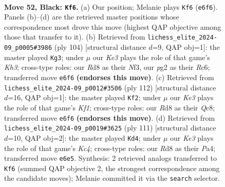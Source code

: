 \documentclass[11pt]{article}
\begin{document}
\clearpage

\begin{figure}[p]\centering
\begin{subfigure}{0.46\textwidth}\centering
\resizebox{\linewidth}{!}{%
\newchessgame
\chessboard[
  setfen={3r4/1Q6/4k3/8/4P3/8/6PP/1K6 b - - 0 52},
  showmover=false,
  pgfstyle=straightmove, color=movearrow, markmove={e6-f6}
]}
\caption{}
\end{subfigure}\hfill
\begin{subfigure}{0.46\textwidth}\centering
\resizebox{\linewidth}{!}{%
\newchessgame
\chessboard[
  setfen={8/p3k3/2R5/7p/8/5N1K/q7/8 w - - 2 53},
  showmover=false,
  pgfstyle=straightmove, color=movearrow, markmove={h3-g3}
]}
\caption{}
\end{subfigure}
\\[4pt]
\begin{subfigure}{0.46\textwidth}\centering
\resizebox{\linewidth}{!}{%
\newchessgame
\chessboard[
  setfen={2Q5/5k2/8/3q4/4p3/8/8/5K2 w - - 0 57},
  showmover=false,
  pgfstyle=straightmove, color=movearrow, markmove={f1-f2}
]}
\caption{}
\end{subfigure}\hfill
\begin{subfigure}{0.46\textwidth}\centering
\resizebox{\linewidth}{!}{%
\newchessgame
\chessboard[
  setfen={8/2K2Q2/8/2k5/p5P1/P7/8/8 b - - 0 56},
  showmover=false,
  pgfstyle=straightmove, color=movearrow, markmove={c5-d4}
]}
\caption{}
\end{subfigure}
\caption{\textbf{Move 52, Black: \texttt{Kf6}.} (a) Our position; Melanie plays \texttt{Kf6} (\texttt{e6f6}). Panels (b)--(d) are the retrieved master positions whose correspondence most drove this move (highest QAP objective among those that transfer to it). (b) Retrieved from \texttt{lichess\_elite\_2024-09\_p0005\#3986} (ply 104) [structural distance $d$=9, QAP obj=1]: the master played \texttt{Kg3}; under $\mu$ our \emph{Ke3} plays the role of that game's \emph{Kh3}; cross-type roles: our \emph{R}d8 as their \emph{N}f3, our \emph{p}g2 as their \emph{R}c6; transferred move \texttt{e6f6} \textbf{(endorses this move)}. (c) Retrieved from \texttt{lichess\_elite\_2024-09\_p0012\#3506} (ply 112) [structural distance $d$=16, QAP obj=1]: the master played \texttt{Kf2}; under $\mu$ our \emph{Ke3} plays the role of that game's \emph{Kf1}; cross-type roles: our \emph{R}d8 as their \emph{Q}c8; transferred move \texttt{e6f6} \textbf{(endorses this move)}. (d) Retrieved from \texttt{lichess\_elite\_2024-09\_p0019\#3625} (ply 111) [structural distance $d$=10, QAP obj=2]: the master played \texttt{Kd4}; under $\mu$ our \emph{Ke3} plays the role of that game's \emph{Kc4}; cross-type roles: our \emph{R}d8 as their \emph{P}a4; transferred move \texttt{e6e5}. Synthesis: 2 retrieved analogs transferred to \texttt{Kf6} (summed QAP objective 2, the strongest correspondence among the candidate moves); Melanie committed it via the \texttt{search} selector.}
\label{fig:thought-m103}
\end{figure}
\end{document}
